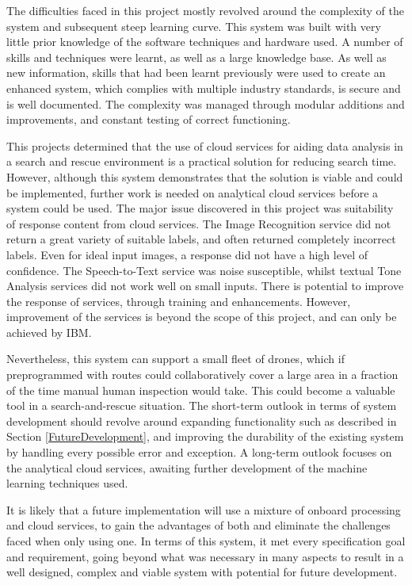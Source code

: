 \documentclass{article}
\begin{document}
The difficulties faced in this project mostly revolved around the complexity of the system and subsequent steep learning curve. This system was built with very little prior knowledge of the software techniques and hardware used. A number of skills and techniques were learnt, as well as a large knowledge base. As well as new information, skills that had been learnt previously were used to create an enhanced system, which complies with multiple industry standards, is secure and is well documented. The complexity was managed through modular additions and improvements, and constant testing of correct functioning.

This projects determined that the use of cloud services for aiding data analysis in a search and rescue environment is a practical solution for reducing search time. However, although this system demonstrates that the solution is viable and could be implemented, further work is needed on analytical cloud services before a system could be used. 
The major issue discovered in this project was suitability of response content from cloud services. The Image Recognition service did not return a great variety of suitable labels, and often returned completely incorrect labels. Even for ideal input images, a response did not have a high level of confidence. The Speech-to-Text service was noise susceptible, whilst textual Tone Analysis services did not work well on small inputs. There is potential to improve the response of services, through training and enhancements. However, improvement of the services is beyond the scope of this project, and can only be achieved by IBM. 


Nevertheless, this system can support a small fleet of drones, which if preprogrammed with routes could collaboratively cover a large area in a fraction of the time manual human inspection would take. This could become a valuable tool in a search-and-rescue situation. The short-term outlook in terms of system development should revolve around expanding functionality such as described in Section \ref{FutureDevelopment}, and improving the durability of the existing system by handling every possible error and exception. A long-term outlook focuses on the analytical cloud services, awaiting further development of the machine learning techniques used. 

It is likely that a future implementation will use a mixture of onboard processing and cloud services, to gain the advantages of both and eliminate the challenges faced when only using one. In terms of this system, it met every specification goal and requirement, going beyond what was necessary in many aspects to result in a well designed, complex and viable system with potential for future development.
\end{document}
